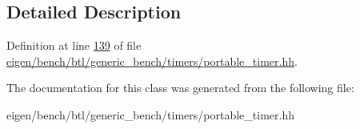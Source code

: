 \subsection{Detailed Description}


Definition at line \hyperlink{eigen_2bench_2btl_2generic__bench_2timers_2portable__timer_8hh_source_l00139}{139} of file \hyperlink{eigen_2bench_2btl_2generic__bench_2timers_2portable__timer_8hh_source}{eigen/bench/btl/generic\+\_\+bench/timers/portable\+\_\+timer.\+hh}.



The documentation for this class was generated from the following file\+:\begin{DoxyCompactItemize}
\item 
eigen/bench/btl/generic\+\_\+bench/timers/portable\+\_\+timer.\+hh\end{DoxyCompactItemize}
